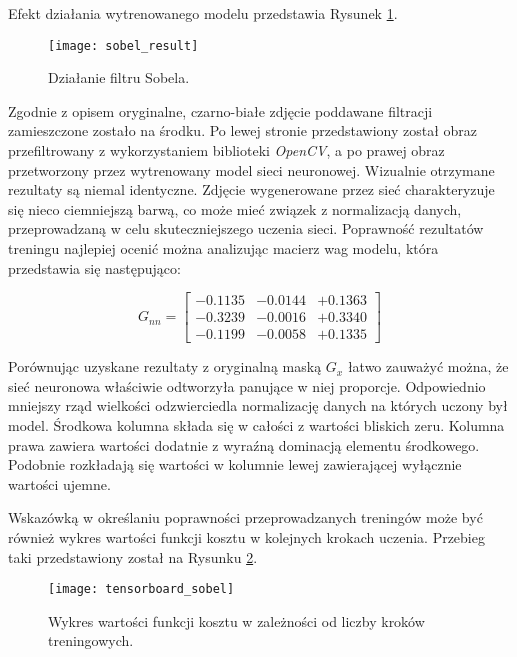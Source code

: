     Efekt działania wytrenowanego modelu przedstawia Rysunek \ref{fig:sobel_result}.

    \begin{figure}[h!]
      \centering
      \texttt{[image: sobel\_result]}
      \caption[Działanie filtru Sobela - źródło: Rysunek własny]{Działanie filtru Sobela.}
      \label{fig:sobel_result}
    \end{figure}

    Zgodnie z opisem oryginalne, czarno-białe zdjęcie poddawane filtracji zamieszczone
    zostało na środku. Po lewej stronie przedstawiony został obraz przefiltrowany
    z wykorzystaniem biblioteki \textit{OpenCV}, a po prawej obraz przetworzony przez
    wytrenowany model sieci neuronowej. Wizualnie otrzymane rezultaty są niemal
    identyczne. Zdjęcie wygenerowane przez sieć charakteryzuje się nieco ciemniejszą
    barwą, co może mieć związek z normalizacją danych, przeprowadzaną w celu skuteczniejszego
    uczenia sieci. Poprawność rezultatów treningu najlepiej ocenić można analizując
    macierz wag modelu, która przedstawia się następująco:

    \begin{equation}
    G_{nn} =
    \begin{bmatrix}
    -0.1135 & -0.0144 & +0.1363 \\
    -0.3239 & -0.0016 & +0.3340 \\
    -0.1199 & -0.0058 & +0.1335
    \end{bmatrix}
  \end{equation}

    Porównując uzyskane rezultaty z oryginalną maską $G_x$ łatwo zauważyć można,
    że sieć neuronowa właściwie odtworzyła panujące w niej proporcje. Odpowiednio
    mniejszy rząd wielkości odzwierciedla normalizację danych na których uczony
    był model. Środkowa kolumna składa się w całości z wartości bliskich zeru.
    Kolumna prawa zawiera wartości dodatnie z wyraźną dominacją elementu środkowego.
    Podobnie rozkładają się wartości w kolumnie lewej zawierającej wyłącznie wartości
    ujemne.

    Wskazówką w określaniu poprawności przeprowadzanych treningów może być również
    wykres wartości funkcji kosztu w kolejnych krokach uczenia. Przebieg taki
    przedstawiony został na Rysunku \ref{fig:tensorboard_sobel}.

    \begin{figure}[h!]
      \centering
      \texttt{[image: tensorboard\_sobel]}
      \caption[Wykres wartości funkcji kosztu w zależności od liczby kroków treningowych - źródło: Rysunek własny]{Wykres wartości funkcji kosztu w zależności od liczby kroków treningowych.}
      \label{fig:tensorboard_sobel}
    \end{figure}

